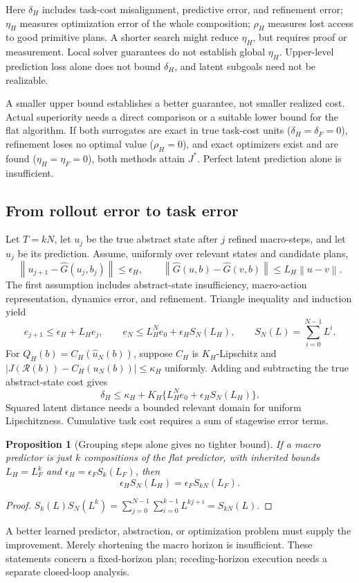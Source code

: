 \documentclass[11pt]{article}
\newtheorem{proposition}[theorem]{Proposition}
\newcommand{\norm}[1]{\left\lVert #1\right\rVert}
\begin{document}
Here $\delta_H$ includes task-cost misalignment, predictive error, and refinement error; $\eta_H$ measures optimization error of the whole composition; $\rho_H$ measures lost access to good primitive plans. A shorter search might reduce $\eta_H$, but requires proof or measurement. Local solver guarantees do not establish global $\eta_H$. Upper-level prediction loss alone does not bound $\delta_H$, and latent subgoals need not be realizable.

A smaller upper bound establishes a better guarantee, not smaller realized cost. Actual superiority needs a direct comparison or a suitable lower bound for the flat algorithm. If both surrogates are exact in true task-cost units ($\delta_H=\delta_F=0$), refinement loses no optimal value ($\rho_H=0$), and exact optimizers exist and are found ($\eta_H=\eta_F=0$), both methods attain $J^*$. Perfect latent prediction alone is insufficient.

\subsection{From rollout error to task error}
Let $T=kN$, let $u_j$ be the true abstract state after $j$ refined macro-steps, and let $\widehat u_j$ be its prediction. Assume, uniformly over relevant states and candidate plans,
\[
 \norm{u_{j+1}-\widehat G(u_j,b_j)}\leq\epsilon_H,\qquad
 \norm{\widehat G(u,b)-\widehat G(v,b)}
 \leq L_H\norm{u-v}.
\]
The first assumption includes abstract-state insufficiency, macro-action representation, dynamics error, and refinement. Triangle inequality and induction yield
\[
 e_{j+1}\leq\epsilon_H+L_He_j,\qquad
 e_N\leq L_H^Ne_0+\epsilon_HS_N(L_H),\qquad
 S_N(L)=\sum_{i=0}^{N-1}L^i .
\]
For $Q_H(b)=C_H(\widehat u_N(b))$, suppose $C_H$ is $K_H$-Lipschitz and
$|J(\mathcal R(b))-C_H(u_N(b))|\leq\kappa_H$ uniformly. Adding and subtracting the true abstract-state cost gives
\[
 \delta_H\leq\kappa_H+
 K_H\{L_H^Ne_0+\epsilon_HS_N(L_H)\}.
\]
Squared latent distance needs a bounded relevant domain for uniform Lipschitzness. Cumulative task cost requires a sum of stagewise error terms.

\begin{proposition}[Grouping steps alone gives no tighter bound]
If a macro predictor is just $k$ compositions of the flat predictor, with inherited bounds
$L_H=L_F^k$ and $\epsilon_H=\epsilon_FS_k(L_F)$, then
\[
 \epsilon_H S_N(L_H)=\epsilon_FS_{kN}(L_F).
\]
\end{proposition}
\begin{proof}
$S_k(L)S_N(L^k)=\sum_{j=0}^{N-1}\sum_{i=0}^{k-1}L^{kj+i}=S_{kN}(L)$.
\end{proof}
A better learned predictor, abstraction, or optimization problem must supply the improvement. Merely shortening the macro horizon is insufficient. These statements concern a fixed-horizon plan; receding-horizon execution needs a separate closed-loop analysis.
\end{document}
